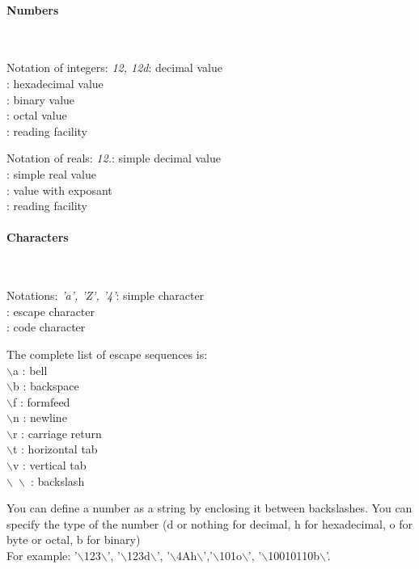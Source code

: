 \documentclass[11pt]{mybook}
\begin{document}
\paragraph{Numbers} 
~\\
\begin{tabbing}
Notation of integers: \={\it{}12, 12d}: decimal value\\
: hexadecimal value\\
: binary value\\
: octal value\\
: reading facility
\end{tabbing}
\begin{tabbing}
Notation of reals: \={\it{}12.}: simple decimal value\\
: simple real value\\
: value with exposant\\
: reading facility
\end{tabbing}

\paragraph{Characters} 
~\\
\begin{tabbing}
Notations: \={\it{}'a', 'Z', '4'}: simple character\\
: escape character\\
: code character
\end{tabbing}
The complete list of escape sequences is: \\
$\backslash$a : bell \\
$\backslash$b : backspace \\
$\backslash$f : formfeed \\
$\backslash$n : newline \\
$\backslash$r : carriage return \\
$\backslash$t : horizontal tab \\
$\backslash$v : vertical tab \\
$\backslash$\ $\backslash$\ : backslash


You can define a number as a string by enclosing it between backslashes. You can specify 
the type of the number (d or nothing for decimal, h for hexadecimal, o for byte or octal,
b for binary)\\
For example: '$\backslash$123$\backslash$', '$\backslash$123d$\backslash$',
'$\backslash$4Ah$\backslash$','$\backslash$101o$\backslash$',
'$\backslash$10010110b$\backslash$'.\\
\end{document}
